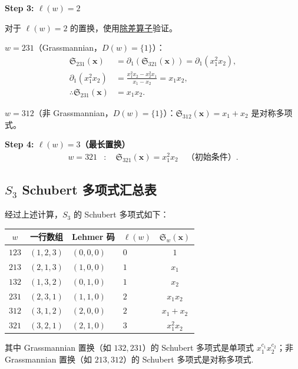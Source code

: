 \begin{Example}
\bigskip
\noindent\textbf{Step 3: $\ell(w) = 2$}

对于 $\ell(w) = 2$ 的置换，使用\hyperref[def:DividedDifference]{除差算子}验证。

$w = 231$（Grassmannian，$D(w) = \{1\}$）：
\begin{align}
\mathfrak{S}_{231}(\mathbf{x}) &= \partial_1(\mathfrak{S}_{321}(\mathbf{x})) = \partial_1(x_1^2 x_2), \\
\partial_1(x_1^2 x_2) &= \frac{x_1^2 x_2 - x_2^2 x_1}{x_1 - x_2} = x_1 x_2, \\
\therefore \mathfrak{S}_{231}(\mathbf{x}) &= x_1 x_2.
\end{align}

$w = 312$（非 Grassmannian，$D(w) = \{1\}$）：$\mathfrak{S}_{312}(\mathbf{x}) = x_1 + x_2$ 是对称多项式。

\bigskip
\noindent\textbf{Step 4: $\ell(w) = 3$（最长置换）}
\begin{align}
w = 321 &: \quad \mathfrak{S}_{321}(\mathbf{x}) = x_1^2 x_2 \quad \text{（初始条件）}.
\end{align}

\subsection*{$S_3$ Schubert 多项式汇总表}

经过上述计算，$S_3$ 的 Schubert 多项式如下：

\begin{center}
\begin{tabular}{ccllc}
$w$ & 一行数组 & Lehmer 码 & $\ell(w)$ & $\mathfrak{S}_w(\mathbf{x})$ \\
\hline
$123$ & $(1,2,3)$ & $(0,0,0)$ & $0$ & $1$ \\
$213$ & $(2,1,3)$ & $(1,0,0)$ & $1$ & $x_1$ \\
$132$ & $(1,3,2)$ & $(0,1,0)$ & $1$ & $x_2$ \\
$231$ & $(2,3,1)$ & $(1,1,0)$ & $2$ & $x_1 x_2$ \\
$312$ & $(3,1,2)$ & $(2,0,0)$ & $2$ & $x_1+x_2$ \\
$321$ & $(3,2,1)$ & $(2,1,0)$ & $3$ & $x_1^2 x_2$
\end{tabular}
\end{center}

其中 Grassmannian 置换（如 $132, 231$）的 Schubert 多项式是单项式 $x_1^{c_1}x_2^{c_2}$；非 Grassmannian 置换（如 $213, 312$）的 Schubert 多项式是对称多项式.

\end{Example}

